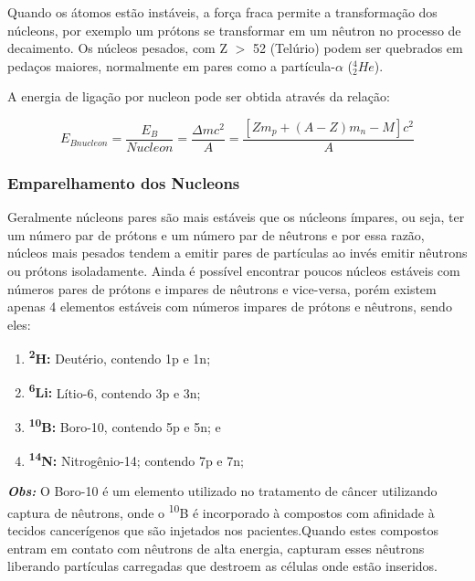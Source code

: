 \documentclass[11pt,a4paper]{article}
\newcounter{exemplo}
\begin{document}
                Quando os átomos estão instáveis, a força fraca permite a transformação dos núcleons, por exemplo um prótons se transformar em um nêutron no processo de decaimento. Os núcleos pesados, com Z $>$ 52  (Telúrio) podem ser quebrados em pedaços maiores, normalmente em pares como a partícula-$\alpha$ (${}_2^4He$).
                
                A energia de ligação por nucleon pode ser obtida através da relação:

                    \begin{equation}
                        E_{Bnucleon} = \frac{E_B}{Nucleon} = \frac{\Delta m c^2}{A} = \frac{\left[Zm_p + (A - Z)m_n - M\right]c^2}{A}
                    \end{equation}

            \subsubsection{Emparelhamento dos Nucleons}

                Geralmente núcleons pares são mais estáveis que os núcleons ímpares, ou seja, ter um número par de prótons e um número par de nêutrons e por essa razão, núcleos mais pesados tendem a emitir pares de partículas ao invés emitir nêutrons ou prótons isoladamente. Ainda é possível encontrar poucos núcleos estáveis com números pares de prótons e impares de nêutrons e vice-versa, porém existem apenas 4 elementos estáveis com números impares de prótons e nêutrons, sendo eles: 

                \begin{enumerate}
                    \item \textbf{\textsuperscript{2}H:} Deutério, contendo 1p e 1n;
                    \item \textbf{\textsuperscript{6}Li:} Lítio-6, contendo 3p e 3n;
                    \item \textbf{\textsuperscript{10}B:} Boro-10, contendo 5p e 5n; e 
                    \item \textbf{\textsuperscript{14}N:} Nitrogênio-14; contendo 7p e 7n;
                \end{enumerate}

                \textbf{\textcolor{CarnationPink}{\textit{Obs:}}} O Boro-10 é um elemento utilizado no tratamento de câncer utilizando captura de nêutrons, onde o \textsuperscript{10}B é incorporado à compostos com afinidade à tecidos cancerígenos que são injetados nos pacientes.Quando estes compostos entram em contato com nêutrons de alta energia, capturam esses nêutrons liberando partículas carregadas que destroem as células onde estão inseridos.
\end{document}
